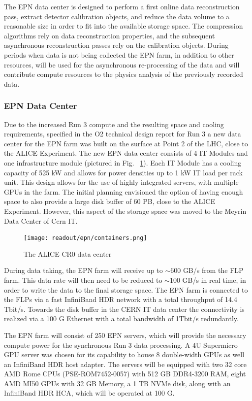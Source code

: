 The EPN data center is designed to perform a first online data reconstruction pass, extract detector calibration objects, and reduce the data volume to a reasonable size in order to fit into the available storage space. 
The compression algorithms rely on data reconstruction properties, and the subsequent asynchronous reconstruction passes rely on the calibration objects.
During periods when data is not being collected the EPN farm, in addition to other resources, will be used for the asynchronous re-processing of the data and will contribute compute resources to the physics analysis of the previously recorded data.

\subsubsection{EPN Data Center}

Due to the increased Run 3 compute and the resulting space and cooling requirements, specified in the O2 technical design report for Run 3 \cite{Buncic:2011297} a new data center for the EPN farm was built on the surface at Point 2 of the LHC, close to the ALICE Experiment. 
The new EPN data center consists of 4 IT Modules and one infrastructure module (pictured in Fig. ~\ref{fig:containers}). 
Each IT Module has a cooling capacity of 525 kW and allows for power densities up to 1 kW IT load per rack unit. 
This design allows for the use of highly integrated servers, with multiple GPUs in the farm. 
The initial planning envisioned the option of having enough space to also provide a large disk buffer of 60 PB, close to the ALICE Experiment. However, this aspect of the storage space was moved to the Meyrin Data Center of Cern IT.

\begin{figure}[ht]
\centering
\texttt{[image: readout/epn/containers.png]}
\caption{The ALICE CR0 data center}
\label{fig:containers}
\end{figure}

During data taking, the EPN farm will receive up to $\sim$600 GB/s from the FLP farm.
This data rate will then need to be reduced to $\sim$100 GB/s in real time, in order to write the data to the final storage space.
The EPN farm is connected to the FLPs via a fast InfiniBand HDR network with a total throughput of 14.4 Tbit/s. 
Towards the disk buffer in the CERN IT data center the connectivity is realized via a 100 G Ethernet with a total bandwidth of 1Tbit/s redundantly.  

The EPN farm will consist of 250 EPN servers, which will provide the necessary compute power for the synchronous Run 3 data processing. 
A 4U Supermicro GPU server was chosen for its capability to house 8 double-width GPUs as well an InfiniBand HDR host adapter. 
The servers will be equipped with two 32 core AMD Rome CPUs (PSE-ROM7452-0057) with 512 GB DDR4-3200 RAM, eight AMD MI50 GPUs with 32 GB Memory, a 1 TB NVMe disk, along with an InfiniBand HDR HCA, which will be operated at 100 G.

